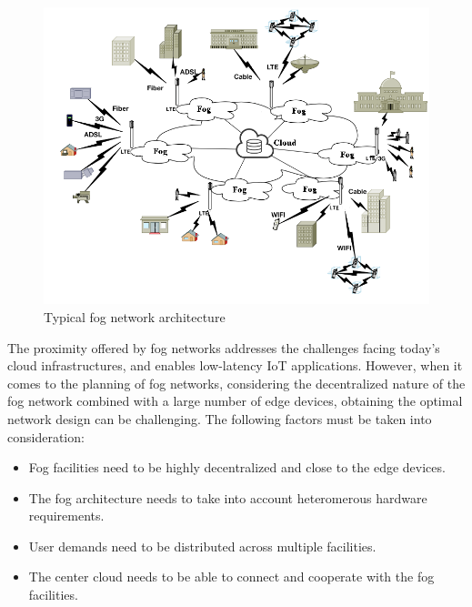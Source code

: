 \documentclass[10pt,journal,compsoc]{IEEEtran}
\begin{document}
\begin{figure}[ht]
\centerline{\includegraphics[width=\columnwidth]{fog-g.png}}
\caption{Typical fog network architecture} 
\label{foggg}
\end{figure}
 
The proximity offered by fog networks addresses the challenges facing today's cloud infrastructures, and enables low-latency IoT applications. However, when it comes to the planning of fog networks, considering the decentralized nature of the fog network combined with a large number of edge devices, obtaining the optimal network design can be challenging. The following factors must be taken into consideration:
\begin{itemize}
\item Fog facilities need to be highly decentralized and close to the edge devices.
\item The fog architecture needs to take into account heteromerous hardware requirements.
\item User demands need to be distributed across multiple facilities.
\item The center cloud needs to be able to connect and cooperate with the fog facilities.
\end{itemize}

\end{document}
